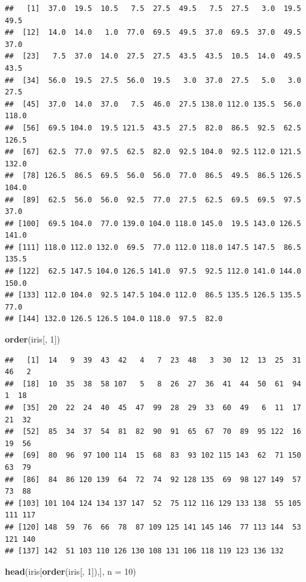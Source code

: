 \documentclass[]{book}
\newenvironment{Shaded}{\begin{snugshade}}{\end{snugshade}}
\newcommand{\DataTypeTok}[1]{\textcolor[rgb]{0.13,0.29,0.53}{#1}}
\newcommand{\DecValTok}[1]{\textcolor[rgb]{0.00,0.00,0.81}{#1}}
\newcommand{\KeywordTok}[1]{\textcolor[rgb]{0.13,0.29,0.53}{\textbf{#1}}}
\newcommand{\NormalTok}[1]{#1}
\begin{document}
\begin{verbatim}
##   [1]  37.0  19.5  10.5   7.5  27.5  49.5   7.5  27.5   3.0  19.5  49.5
##  [12]  14.0  14.0   1.0  77.0  69.5  49.5  37.0  69.5  37.0  49.5  37.0
##  [23]   7.5  37.0  14.0  27.5  27.5  43.5  43.5  10.5  14.0  49.5  43.5
##  [34]  56.0  19.5  27.5  56.0  19.5   3.0  37.0  27.5   5.0   3.0  27.5
##  [45]  37.0  14.0  37.0   7.5  46.0  27.5 138.0 112.0 135.5  56.0 118.0
##  [56]  69.5 104.0  19.5 121.5  43.5  27.5  82.0  86.5  92.5  62.5 126.5
##  [67]  62.5  77.0  97.5  62.5  82.0  92.5 104.0  92.5 112.0 121.5 132.0
##  [78] 126.5  86.5  69.5  56.0  56.0  77.0  86.5  49.5  86.5 126.5 104.0
##  [89]  62.5  56.0  56.0  92.5  77.0  27.5  62.5  69.5  69.5  97.5  37.0
## [100]  69.5 104.0  77.0 139.0 104.0 118.0 145.0  19.5 143.0 126.5 141.0
## [111] 118.0 112.0 132.0  69.5  77.0 112.0 118.0 147.5 147.5  86.5 135.5
## [122]  62.5 147.5 104.0 126.5 141.0  97.5  92.5 112.0 141.0 144.0 150.0
## [133] 112.0 104.0  92.5 147.5 104.0 112.0  86.5 135.5 126.5 135.5  77.0
## [144] 132.0 126.5 126.5 104.0 118.0  97.5  82.0
\end{verbatim}

\begin{Shaded}
\begin{Highlighting}[]
\KeywordTok{order}\NormalTok{(iris[, }\DecValTok{1}\NormalTok{])}
\end{Highlighting}
\end{Shaded}

\begin{verbatim}
##   [1]  14   9  39  43  42   4   7  23  48   3  30  12  13  25  31  46   2
##  [18]  10  35  38  58 107   5   8  26  27  36  41  44  50  61  94   1  18
##  [35]  20  22  24  40  45  47  99  28  29  33  60  49   6  11  17  21  32
##  [52]  85  34  37  54  81  82  90  91  65  67  70  89  95 122  16  19  56
##  [69]  80  96  97 100 114  15  68  83  93 102 115 143  62  71 150  63  79
##  [86]  84  86 120 139  64  72  74  92 128 135  69  98 127 149  57  73  88
## [103] 101 104 124 134 137 147  52  75 112 116 129 133 138  55 105 111 117
## [120] 148  59  76  66  78  87 109 125 141 145 146  77 113 144  53 121 140
## [137] 142  51 103 110 126 130 108 131 106 118 119 123 136 132
\end{verbatim}

\begin{Shaded}
\begin{Highlighting}[]
\KeywordTok{head}\NormalTok{(iris[}\KeywordTok{order}\NormalTok{(iris[, }\DecValTok{1}\NormalTok{]),], }\DataTypeTok{n =} \DecValTok{10}\NormalTok{)}
\end{Highlighting}
\end{Shaded}
\end{document}
